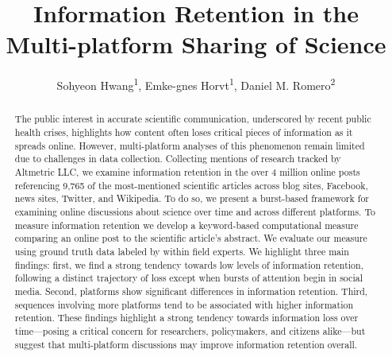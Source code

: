 \documentclass[letterpaper]{article} %
\title{Information Retention in the Multi-platform Sharing of Science}
\author {
    Sohyeon Hwang\textsuperscript{\rm 1},
    Emke-gnes Horvt\textsuperscript{\rm 1},
    Daniel M. Romero\textsuperscript{\rm 2} \\
}
\begin{document}
\maketitle

\begin{abstract}
The public interest in accurate scientific communication, underscored by recent public health crises, highlights how content often loses critical pieces of information as it spreads online. However, multi-platform analyses of this phenomenon remain limited due to challenges in data collection. Collecting mentions of research tracked by Altmetric LLC, we examine information retention in the over 4 million online posts referencing 9,765 of the most-mentioned scientific articles across blog sites, Facebook, news sites, Twitter, and Wikipedia. To do so, we present a burst-based framework for examining online discussions about science over time and across different platforms. To measure information retention we develop a keyword-based computational measure comparing an online post to the scientific article's abstract. We evaluate our measure using ground truth data labeled by within field experts. We highlight three main findings: first, we find a strong tendency towards low levels of information retention, following a distinct trajectory of loss except when bursts of attention begin in social media. Second, platforms show significant differences in information retention. Third, sequences involving more platforms tend to be associated with higher information retention. These findings highlight a strong tendency towards information loss over time---posing a critical concern for researchers, policymakers, and citizens alike---but suggest that multi-platform discussions may improve information retention overall.
\end{abstract}
\end{document}
